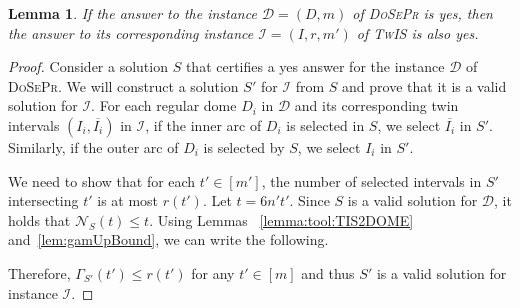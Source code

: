 \documentclass[letterpaper,11pt]{article}
\newtheorem{lemma}[theorem]{Lemma}
\newcommand{\tis}{\textsc{TwIS}\xspace}
\newcommand{\dspr}{\textsc{DoSePr}\xspace}
\begin{document}
\begin{lemma}
\label{lemma:DSPR2TIS}
If the answer to the instance $\mathcal{D}=(D,m)$ of \dspr is yes, then the answer to its corresponding instance $\mathcal{I}=(I,r,m')$ of \tis is also yes. 
\end{lemma}
\begin{proof}
Consider a solution $S$ that certifies a yes answer for the instance $\mathcal{D}$ of \dspr. We will construct a solution $S'$ for $\mathcal{I}$ from $S$ and prove that it is a valid solution for $\mathcal{I}$. For each regular dome $D_i$ in $\mathcal{D}$  and its corresponding twin intervals $(I_i, \overline{I_i})$ in $\mathcal{I}$, if the inner arc of $D_i$ is selected in $S$, we select $\overline{I_i}$ in $S'$. Similarly, if the outer arc of $D_i$ is selected by $S$, we select $I_i$ in $S'$. 

We need to show that for each $t'\in[m']$, the number of selected intervals in $S'$ intersecting $t'$ is at most $r(t')$. Let $t= 6n't'$. Since $S$ is a valid solution for $\mathcal{D}$, it holds that $\mathcal{N}_S(t)\leq t$. Using Lemmas ~\ref{lemma:tool:TIS2DOME} and~\ref{lem:gamUpBound}, we can write the following. 


Therefore, $\Gamma_{S'}(t') \leq r(t')$ for any $t'\in[m]$ and thus $S'$ is a valid solution for instance $\mathcal{I}$.
\end{proof}
\end{document}
